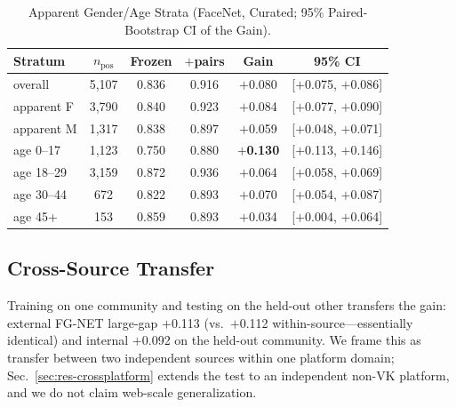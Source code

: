 \documentclass[journal]{IEEEtran}
\begin{document}
\begin{table}[!t]
\renewcommand{\arraystretch}{1.2}
\caption{Apparent Gender/Age Strata (FaceNet, Curated; 95\% Paired-Bootstrap CI of the Gain).}
\label{tab:strata}
\centering
\footnotesize
\begin{tabular}{@{}lccccc@{}}
\toprule
Stratum & $n_{\text{pos}}$ & Frozen & $+$pairs & Gain & 95\% CI \\
\midrule
overall & 5{,}107 & 0.836 & 0.916 & $+$0.080 & [$+$0.075, $+$0.086] \\
apparent F & 3{,}790 & 0.840 & 0.923 & $+$0.084 & [$+$0.077, $+$0.090] \\
apparent M & 1{,}317 & 0.838 & 0.897 & $+$0.059 & [$+$0.048, $+$0.071] \\
age 0--17 & 1{,}123 & 0.750 & 0.880 & \textbf{$+$0.130} & [$+$0.113, $+$0.146] \\
age 18--29 & 3{,}159 & 0.872 & 0.936 & $+$0.064 & [$+$0.058, $+$0.069] \\
age 30--44 & 672 & 0.822 & 0.893 & $+$0.070 & [$+$0.054, $+$0.087] \\
age 45+ & 153 & 0.859 & 0.893 & $+$0.034 & [$+$0.004, $+$0.064] \\
\bottomrule
\end{tabular}
\end{table}

\subsection{Cross-Source Transfer}\label{sec:res-cross}
Training on one community and testing on the held-out other transfers the gain: external FG-NET large-gap $+$0.113 (vs.\ $+$0.112 within-source---essentially identical) and internal $+$0.092 on the held-out community. We frame this as transfer between two independent sources within one platform domain; Sec.~\ref{sec:res-crossplatform} extends the test to an independent non-VK platform, and we do not claim web-scale generalization.
\end{document}

